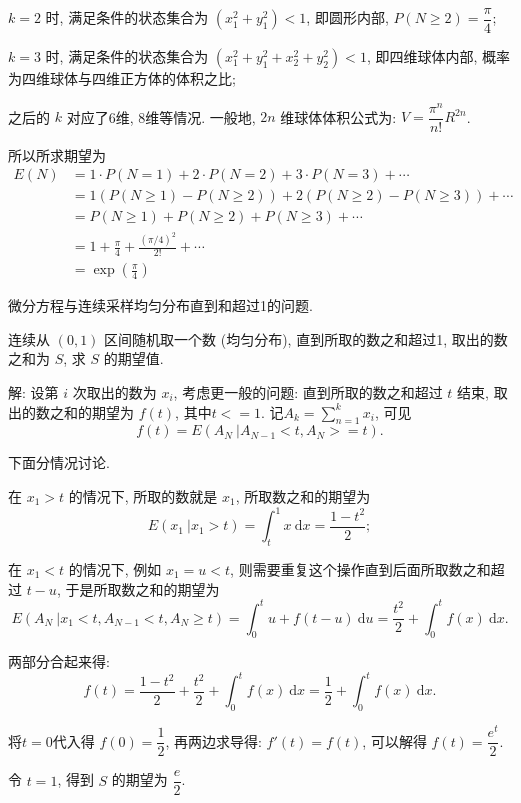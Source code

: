 $ k = 2 $ 时, 满足条件的状态集合为 $ (x_1^2+y_1^2) < 1 $, 即圆形内部, $ P(N\ge 2)=\dfrac{\pi}{4} $; 

$ k = 3 $ 时, 满足条件的状态集合为 $ (x_1^2+y_1^2+x_2^2+y_2^2) < 1 $, 即四维球体内部, 概率为四维球体与四维正方体的体积之比;

之后的 $ k $ 对应了6维, 8维等情况. 一般地, $ 2n $ 维球体体积公式为: $ V=\dfrac{\pi^n}{n!}R^{2n} $.

所以所求期望为
\begin{align*}
E(N)  &= 1\cdot P(N=1) + 2\cdot P(N=2) + 3\cdot P(N=3) + \cdots \\
	&= 1(P(N\ge 1) - P(N\ge 2)) + 2(P(N\ge 2) - P(N\ge 3)) + \cdots \\
	&= P(N\ge 1) + P(N\ge 2) + P(N\ge 3) + \cdots \\
	& = 1 + \frac{\pi}{4} + \frac{(\pi/4)^2}{2!} + \cdots \\
	& = \exp(\frac{\pi}{4})
\end{align*}


\newpage
\noindent 微分方程与连续采样均匀分布直到和超过1的问题.

连续从 $ (0,1) $ 区间随机取一个数 (均匀分布), 直到所取的数之和超过1, 取出的数之和为 $ S $, 求 $ S $ 的期望值.

解: 设第 $i$ 次取出的数为 $x_i$, 考虑更一般的问题: 直到所取的数之和超过 $t$ 结束, 取出的数之和的期望为 $f(t)$, 其中$t <= 1$. 记$\displaystyle A_k = \sum_{n=1}^k x_i$, 可见
\[ f(t) = E(A_N \ | A_{N-1} < t, A_N >= t) .\]

下面分情况讨论.

在 $x_1 > t$ 的情况下, 所取的数就是 $x_1$, 所取数之和的期望为 
\[E(x_1\ | x_1 > t) = \int_t^1{x}\ \mathrm{d}x = \frac{1-t^2}{2} ;\]

在 $x_1 < t$ 的情况下, 例如 $x_1 = u < t$, 则需要重复这个操作直到后面所取数之和超过 $t - u$, 于是所取数之和的期望为 
\[
E(A_N \ | x_1 < t, A_{N-1} < t, A_N \ge t) = \int_0^t{u + f(t - u)}\ \mathrm{d}u = \frac{t^2}{2} + \int_0^t f(x)\ \mathrm{d}x .
\]

两部分合起来得:
\[f(t) = \frac{1-t^2}{2} + \frac{t^2}{2} + \int_0^t f(x)\ \mathrm{d}x = \frac{1}{2} + \int_0^t f(x)\ \mathrm{d}x .\]

将$t = 0$代入得 $f(0) = \dfrac{1}{2}$, 再两边求导得: $f'(t) = f(t) $, 可以解得 $f(t) = \dfrac{e^t}{2}$.

令 $t=1$, 得到 $S$ 的期望为 $\dfrac{e}{2}$.

~

